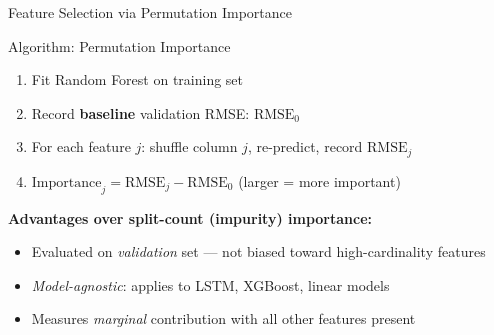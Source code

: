 \documentclass[aspectratio=169, 10pt]{beamer}
\begin{document}
\begin{frame}{Feature Selection via Permutation Importance}
  \begin{definitionbox}{Algorithm: Permutation Importance \parencite{Molnar2022}}
    \footnotesize
    \begin{enumerate}
      \item Fit Random Forest on training set
      \item Record \textbf{baseline} validation RMSE: $\text{RMSE}_0$
      \item For each feature $j$: shuffle column $j$, re-predict,
            record $\text{RMSE}_j$
      \item $\text{Importance}_j = \text{RMSE}_j - \text{RMSE}_0$
            \quad (larger = more important)
    \end{enumerate}
  \end{definitionbox}

  \medskip
  \textbf{Advantages over split-count (impurity) importance:}
  \begin{itemize}
    \item Evaluated on \emph{validation} set --- not biased toward
          high-cardinality features
    \item \emph{Model-agnostic}: applies to LSTM, XGBoost, linear models
    \item Measures \emph{marginal} contribution with all other features present
  \end{itemize}

  \medskip
\end{frame}
\end{document}
